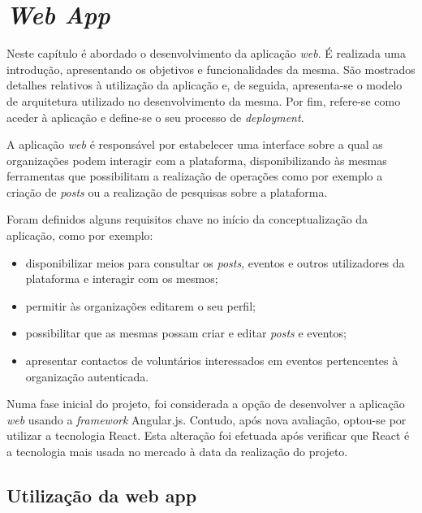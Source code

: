 \section{\textit{Web App}}

Neste capítulo é abordado o desenvolvimento da aplicação \textit{web}. É realizada uma introdução, apresentando os objetivos e funcionalidades da mesma. São mostrados detalhes relativos à utilização da aplicação e, de seguida, apresenta-se o modelo de arquitetura utilizado no desenvolvimento da mesma. Por fim, refere-se como aceder à aplicação e define-se o seu processo de \textit{deployment}.

\par \smallskip

A aplicação \textit{web} é responsável por estabelecer uma interface sobre a qual as organizações podem interagir com a plataforma, disponibilizando às mesmas ferramentas que possibilitam a realização de operações como por exemplo a criação de \textit{posts} ou a realização de pesquisas sobre a plataforma.

\par \smallskip

Foram definidos alguns requisitos chave no início da conceptualização da aplicação, como por exemplo:

\begin{itemize}
	\item disponibilizar meios para consultar os \textit{posts}, eventos e outros utilizadores da plataforma e interagir com os mesmos; 
	\item permitir às organizações editarem o seu perfil;
	\item possibilitar que as mesmas possam criar e editar \textit{posts} e eventos;
	\item apresentar contactos de voluntários interessados em eventos pertencentes à organização autenticada.
\end{itemize}

Numa fase inicial do projeto, foi considerada a opção de desenvolver a aplicação \textit{web} usando a \textit{framework} Angular.js. Contudo, após nova avaliação, optou-se por utilizar a tecnologia React. Esta alteração foi efetuada após verificar que React é a tecnologia mais usada no mercado à data da realização do projeto. 

\subsection{Utilização da web app}

